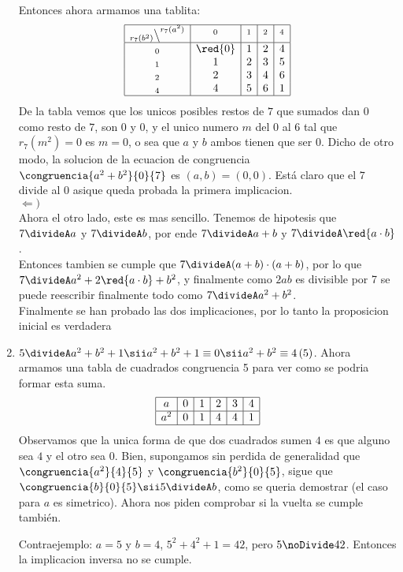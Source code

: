 \begin{enumerate}[label=\alph*)]
        Entonces ahora armamos una tablita: \\
        $$
          \begin{array}{|c|c|c|c|c|}
            \hline
            _{r_7(b^2)}\big\backslash^{r_7(a^2)} & ^0      & ^1 & ^2 & ^4 \\ \hline
            _0                                   & \red{0} & 1  & 2  & 4  \\
            _1                                   & 1       & 2  & 3  & 5  \\
            _2                                   & 2       & 3  & 4  & 6  \\
            _4                                   & 4       & 5  & 6  & 1  \\\hline
          \end{array}
        $$
        De la tabla vemos que los unicos posibles restos de $7$ que sumados dan $0$ como resto de $7$, son $0$ y $0$, y
        el unico numero $m$ del $0$ al $6$ tal que $r_7(m^2) = 0$ es $m = 0$, o sea que $a$ y $b$ ambos tienen que ser $0$.
        Dicho de otro modo, la solucion de la ecuacion de congruencia $\congruencia{a^2 + b^2}{0}{7}$ es $(a,b) = (0,0)$.
        Está claro que el $7$ divide al $0$ asique queda probada la primera implicacion. \\
        $\Leftarrow)$ \\
        Ahora el otro lado, este es mas sencillo. Tenemos de hipotesis que $7\divideA a$ y $7\divideA b$, por ende $7\divideA a+b$ y $7\divideA \red{a\cdot b}$. \\
        Entonces tambien se cumple que $7\divideA (a+b)\cdot(a+b)$, por lo que $7\divideA a^2 + 2\red{a\cdot b} + b^2$, y finalmente como $2ab$ es divisible por 7
        se puede reescribir finalmente todo como $7\divideA a^2 + b^2$.\\
        Finalmente se han probado las dos implicaciones, por lo tanto la proposicion inicial es verdadera

  \item $5 \divideA a^2 + b^2 + 1 \sii a^2 + b^2 + 1 \equiv 0 \sii a^2 + b^2 \equiv 4 \, (5)$. Ahora armamos una tabla de cuadrados
  congruencia 5 para ver como se podria formar esta suma. 
  $$
  \begin{array}{|c|c|c|c|c|c|}
  \hline
   a    & 0 & 1 & 2 & 3 & 4 \\ \hline
   a^2  & 0 & 1 & 4 & 4 & 1 \\ \hline
  \end{array}
  $$
  Observamos que la unica forma de que dos cuadrados sumen $4$ es que alguno sea $4$ y el otro sea $0$. Bien, supongamos 
  sin perdida de generalidad que $\congruencia{a^2}{4}{5}$ y $\congruencia{b^2}{0}{5}$, sigue que $\congruencia{b}{0}{5}
  \sii 5 \divideA b$, como se queria demostrar (el caso para $a$ es simetrico).  
  Ahora nos piden comprobar si la vuelta se cumple también. 

  Contraejemplo: $a = 5$ y $b=4$, $5^2 + 4^2 + 1 = 42$, pero $5 \noDivide 42$. Entonces la implicacion inversa no se cumple.
\end{enumerate}

\begin{aportes}
  \item {}
\end{aportes}
